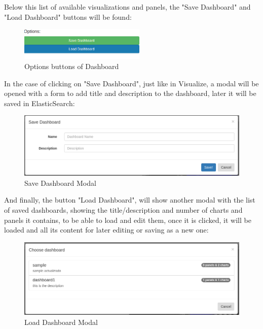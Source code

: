 \documentclass[a4paper, 12pt]{book}
\begin{document}
Below this list of available visualizations and panels, the "Save Dashboard" and "Load Dashboard" buttons will be found:

\begin{figure}[H]
  \centering
  \includegraphics[width=6cm, keepaspectratio]{img/development/dashbuttons}
  \caption{Options buttons of Dashboard}
  \label{fig:dashbuttons}
\end{figure}

In the case of clicking on "Save Dashboard", just like in Visualize, a modal will be opened with a form to add title and description to the dashboard, later it will be saved in ElasticSearch:

\begin{figure}[H]
  \centering
  \includegraphics[width=16cm, keepaspectratio]{img/development/examplesavedash}
  \caption{Save Dashboard Modal}
  \label{fig:examplesavedash}
\end{figure}

And finally, the button "Load Dashboard", will show another modal with the list of saved dashboards, showing the title/description and number of charts and panels it contains, to be able to load and edit them, once it is clicked, it will be loaded and all its content for later editing or saving as a new one:

\begin{figure}[H]
  \centering
  \includegraphics[width=16cm, keepaspectratio]{img/development/exampleloaddash}
  \caption{Load Dashboard Modal}
  \label{fig:exampleloaddash}
\end{figure}
\end{document}

